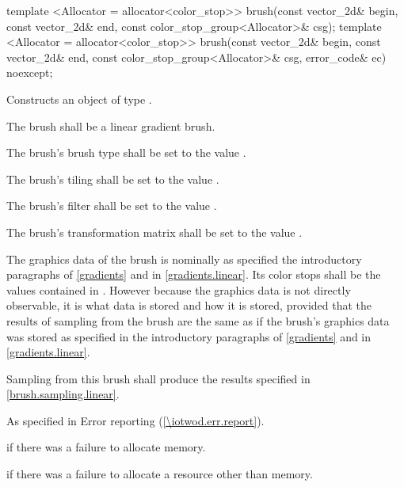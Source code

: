 \begin{itemdecl}
template <Allocator = allocator<color_stop>>
brush(const vector_2d& begin, const vector_2d& end,
  const color_stop_group<Allocator>& csg);
template <Allocator = allocator<color_stop>>
brush(const vector_2d& begin, const vector_2d& end,
  const color_stop_group<Allocator>& csg, error_code& ec) noexcept;
\end{itemdecl}
\begin{itemdescr}
\pnum
\effects
Constructs an object of type .

\pnum
The brush shall be a linear gradient brush.

\pnum
The brush's brush type shall be set to the value .

\pnum
The brush's tiling shall be set to the value .

\pnum
The brush's filter shall be set to the value .

\pnum
The brush's transformation matrix shall be set to the value .

\pnum
The graphics data of the brush is nominally as specified the introductory paragraphs of \ref{gradients} and in \ref{gradients.linear}. Its color stops shall be the values contained in . However because the graphics data is not directly observable, it is \unspecnorm what data is stored and how it is stored, provided that the results of sampling from the brush are the same as if the brush's graphics data was stored as specified in the introductory paragraphs of \ref{gradients} and in \ref{gradients.linear}.

\pnum
\remarks
Sampling from this brush shall produce the results specified in \ref{brush.sampling.linear}.

\pnum
\throws
As specified in Error reporting (\ref{\iotwod.err.report}).

\pnum
\errors
{} if there was a failure to allocate memory.

 if there was a failure to allocate a resource other than memory.
\end{itemdescr}

